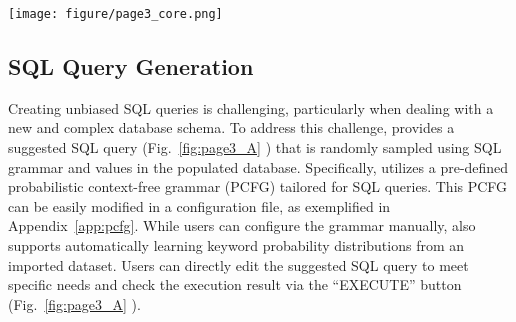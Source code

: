 


\begin{figure*}[ht]
  \centering
  \texttt{[image: figure/page3\_core.png]}
  \caption{The user interface for data generation, error detection, and repair. }
  \label{fig:page3_A}
\end{figure*}

\subsection{\textbf{SQL Query Generation}}
\label{sec:sql_sampling}
Creating unbiased SQL queries is challenging, particularly when dealing with a new and complex database schema. 
To address this challenge, {\tool} provides a suggested SQL query (Fig.~\ref{fig:page3_A} ) that is randomly sampled using SQL grammar and values in the populated database.
Specifically, {\tool} utilizes a pre-defined probabilistic context-free grammar (PCFG) tailored for SQL queries. This PCFG can be easily modified in a configuration file, as exemplified in Appendix~\ref{app:pcfg}.
While users can configure the grammar manually, {\tool} also supports automatically learning keyword probability distributions from an imported dataset.
Users can directly edit the suggested SQL query to meet specific needs and check the execution result via the ``EXECUTE'' button (Fig.~\ref{fig:page3_A} ). 

